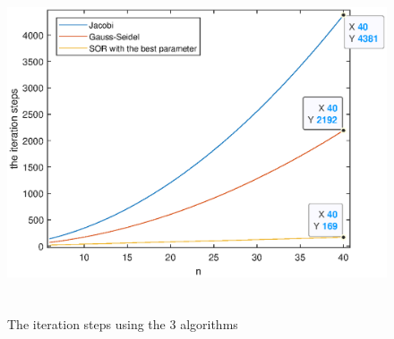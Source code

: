 \documentclass[UTF8,a4paper,10pt]{ctexart}
\begin{document}
\begin{figure}[ht]
    \centering
    \includegraphics[width=14cm,height=10cm]{2.3_steps.eps}
    \caption{The iteration steps using the 3 algorithms}
\end{figure}
\end{document}
